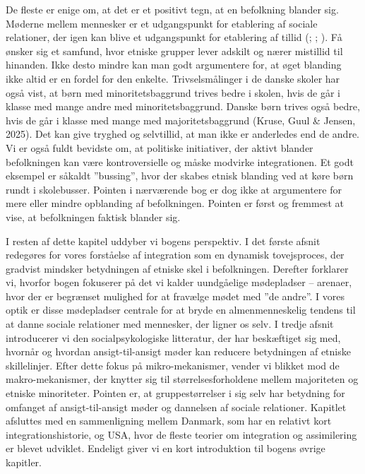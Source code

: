 \documentclass[
]{book}
\begin{document}
De fleste er enige om, at det er et positivt tegn, at en befolkning blander sig. Møderne mellem mennesker er et udgangspunkt for etablering af sociale relationer, der igen kan blive et udgangspunkt for etablering af tillid (; ; ). Få ønsker sig et samfund, hvor etniske grupper lever adskilt og nærer mistillid til hinanden. Ikke desto mindre kan man godt argumentere for, at øget blanding ikke altid er en fordel for den enkelte. Trivselsmålinger i de danske skoler har også vist, at børn med minoritetsbaggrund trives bedre i skolen, hvis de går i klasse med mange andre med minoritetsbaggrund. Danske børn trives også bedre, hvis de går i klasse med mange med majoritetsbaggrund (Kruse, Guul \& Jensen, 2025). Det kan give tryghed og selvtillid, at man ikke er anderledes end de andre. Vi er også fuldt bevidste om, at politiske initiativer, der aktivt blander befolkningen kan være kontroversielle og måske modvirke integrationen. Et godt eksempel er såkaldt ''bussing'', hvor der skabes etnisk blanding ved at køre børn rundt i skolebusser. Pointen i nærværende bog er dog ikke at argumentere for mere eller mindre opblanding af befolkningen. Pointen er først og fremmest at vise, at befolkningen faktisk blander sig.

I resten af dette kapitel uddyber vi bogens perspektiv. I det første afsnit redegøres for vores forståelse af integration som en dynamisk tovejsproces, der gradvist mindsker betydningen af etniske skel i befolkningen. Derefter forklarer vi, hvorfor bogen fokuserer på det vi kalder uundgåelige mødepladser -- arenaer, hvor der er begrænset mulighed for at fravælge mødet med ''de andre''. I vores optik er disse mødepladser centrale for at bryde en almenmenneskelig tendens til at danne sociale relationer med mennesker, der ligner os selv. I tredje afsnit introducerer vi den socialpsykologiske litteratur, der har beskæftiget sig med, hvornår og hvordan ansigt-til-ansigt møder kan reducere betydningen af etniske skillelinjer. Efter dette fokus på mikro-mekanismer, vender vi blikket mod de makro-mekanismer, der knytter sig til størrelsesforholdene mellem majoriteten og etniske minoriteter. Pointen er, at gruppestørrelser i sig selv har betydning for omfanget af ansigt-til-ansigt møder og dannelsen af sociale relationer. Kapitlet afsluttes med en sammenligning mellem Danmark, som har en relativt kort integrationshistorie, og USA, hvor de fleste teorier om integration og assimilering er blevet udviklet. Endeligt giver vi en kort introduktion til bogens øvrige kapitler.
\end{document}
